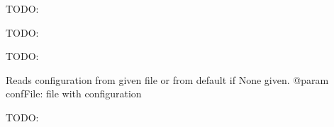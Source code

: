 \documentclass[letterpaper,10pt,english]{sphinxmanual}
\begin{document}
\begin{fulllineitems}
\begin{fulllineitems}
\end{fulllineitems}


\begin{fulllineitems}
\label{ref-manual/XrdTestSlave:XrdTestSlave.XrdTestSlave.handleTestSuiteFinalize}
TODO:

\end{fulllineitems}


\begin{fulllineitems}
\label{ref-manual/XrdTestSlave:XrdTestSlave.XrdTestSlave.handleTestSuiteInitialize}
TODO:

\end{fulllineitems}


\begin{fulllineitems}
\label{ref-manual/XrdTestSlave:XrdTestSlave.XrdTestSlave.parseTags}
TODO:

\end{fulllineitems}


\begin{fulllineitems}
\label{ref-manual/XrdTestSlave:XrdTestSlave.XrdTestSlave.readConfig}
Reads configuration from given file or from default if None given.
@param confFile: file with configuration

\end{fulllineitems}


\begin{fulllineitems}
\label{ref-manual/XrdTestSlave:XrdTestSlave.XrdTestSlave.recvLoop}
TODO:

\end{fulllineitems}



\end{fulllineitems}
\end{document}
